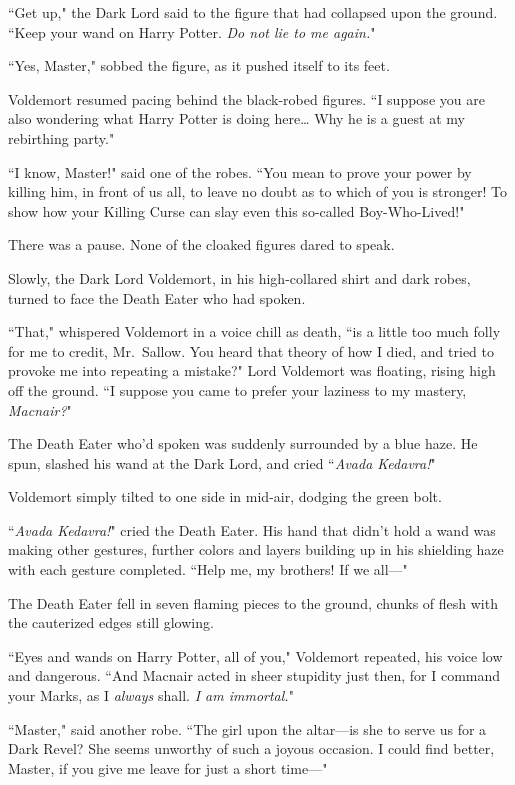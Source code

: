 ``Get up," the Dark Lord said to the figure that had collapsed upon the ground. ``Keep your wand on Harry Potter. \emph{Do not lie to me again.}"

``Yes, Master," sobbed the figure, as it pushed itself to its feet.

Voldemort resumed pacing behind the black-robed figures. ``I suppose you are also wondering what Harry Potter is doing here{\ldots} Why he is a guest at my rebirthing party."

``I know, Master!" said one of the robes. ``You mean to prove your power by killing him, in front of us all, to leave no doubt as to which of you is stronger! To show how your Killing Curse can slay even this so-called Boy-Who-Lived!"

There was a pause. None of the cloaked figures dared to speak.

Slowly, the Dark Lord Voldemort, in his high-collared shirt and dark robes, turned to face the Death Eater who had spoken.

``That," whispered Voldemort in a voice chill as death, ``is a little too much folly for me to credit, Mr.~Sallow. You heard that theory of how I died, and tried to provoke me into repeating a mistake?" Lord Voldemort was floating, rising high off the ground. ``I suppose you came to prefer your laziness to my mastery, \emph{Macnair?}"

The Death Eater who'd spoken was suddenly surrounded by a blue haze. He spun, slashed his wand at the Dark Lord, and cried ``\emph{Avada Kedavra!}"

Voldemort simply tilted to one side in mid-air, dodging the green bolt.

``\emph{Avada Kedavra!}" cried the Death Eater. His hand that didn't hold a wand was making other gestures, further colors and layers building up in his shielding haze with each gesture completed. ``Help me, my brothers! If we all—"

The Death Eater fell in seven flaming pieces to the ground, chunks of flesh with the cauterized edges still glowing.

``Eyes and wands on Harry Potter, all of you," Voldemort repeated, his voice low and dangerous. ``And Macnair acted in sheer stupidity just then, for I command your Marks, as I \emph{always} shall. \emph{I am immortal.}"

``Master," said another robe. ``The girl upon the altar—is she to serve us for a Dark Revel? She seems unworthy of such a joyous occasion. I could find better, Master, if you give me leave for just a short time—"

